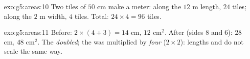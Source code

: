 \begin{solution}{exo:g5:areas:10}
Two tiles of $50$ cm make a meter: along the $12$ m length,
$24$ tiles; along the $2$ m width, $4$ tiles. Total:
$24 \times 4 = 96$ tiles.
\end{solution}

\begin{solution}{exo:g5:areas:11}
Before:  $2 \times (4 + 3) = 14$ cm,  $12$ cm$^2$.
After (sides $8$ and $6$):  $28$ cm,  $48$ cm$^2$.
The  \emph{doubled}; the  was multiplied by
\emph{four} ($2 \times 2$): lengths and  do not scale the same
way.
\end{solution}
